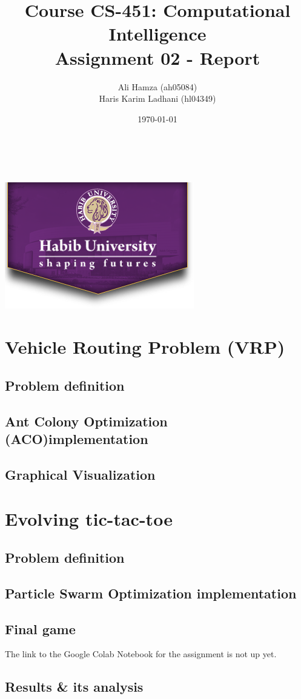 \documentclass[11pt, letterpaper]{article}
\begin{document}
\title{\large Course CS-451: Computational Intelligence\\[0.5cm]
        \bf\Large Assignment 02 - Report}
\author{\large Ali Hamza (ah05084) \\ Haris Karim Ladhani (hl04349)}
\date{\today}
\makeatletter
    \begin{titlepage}
        \begin{center}
        \vbox{}\vspace{5cm}
            {\@title }\\[3cm] 
            {\@author}\\
            \vfill \includegraphics[scale=0.5]{images/logo.png}\\[1cm]
            {\@date}
        \end{center}
    \end{titlepage}
\makeatother

\newpage

\tableofcontents

\newpage

\section{Vehicle Routing Problem (VRP)}
\subsection{Problem definition}
\subsection{Ant Colony Optimization (ACO)implementation}
\subsection{Graphical Visualization}

\section{Evolving tic-tac-toe}
\subsection{Problem definition}
\subsection{Particle Swarm Optimization implementation}
\subsection {Final game}
The link to the Google Colab Notebook for the assignment is not up yet.
\subsection {Results \& its analysis}
\end{document}
